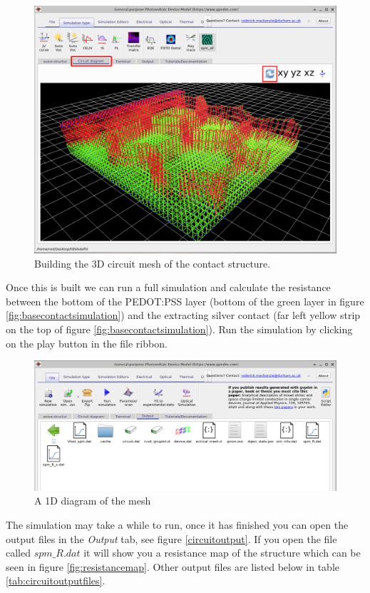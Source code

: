 \begin{figure}[H]
\centering
\includegraphics[width=\textwidth]{./images/la_2.png}
\caption{Building the 3D circuit mesh of the contact structure.}
\label{fig:threedcircuitmesh}
\end{figure}

Once this is built we can run a full simulation and calculate the resistance between the bottom of the PEDOT:PSS layer (bottom of the green layer in figure \ref{fig:basecontactsimulation}) and the extracting silver contact (far left yellow strip on the top of figure \ref{fig:basecontactsimulation}). Run the simulation by clicking on the play button in the file ribbon.

\begin{figure}[H]
\centering
\includegraphics[width=\textwidth]{./images/la_3.png}
\caption{A 1D diagram of the mesh}
\label{fig:circuitoutput}
\end{figure}

The simulation may take a while to run, once it has finished you can open the output files in the \emph{Output} tab, see figure \ref{circuitoutput}.  If you open the file called $spm\_R.dat$ it will show you a resistance map of the structure which can be seen in figure \ref{fig:resistancemap}. Other output files are listed below in table \ref{tab:circuitoutputfiles}.

